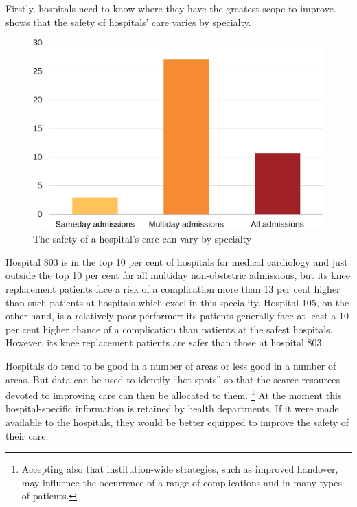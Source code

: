 \documentclass[FrontPage]{grattan}
\begin{document}
Firstly, hospitals need to know where they have the greatest scope to improve.
 shows that the safety of hospitals' care varies by specialty.

\begin{figure}
\caption{The safety of a hospital's care can vary by specialty}\label{fig:safety-of-hospitals-care-varies-by-specialty}
\includegraphics[page=12]{atlas/comps_charts.pdf}
\end{figure}

Hospital 803 is in the top 10 per cent of hospitals for medical cardiology and just outside the top 10 per cent for all multiday non-obstetric admissions, but its knee replacement patients face a risk of a complication more than 13 per cent higher than such patients at hospitals which excel in this speciality.
Hospital 105, on the other hand, is a relatively poor performer: its patients generally face at least a 10 per cent higher chance of a complication than patients at the safest hospitals.
However, its knee replacement patients are safer than those at hospital 803.

Hospitals do tend to be good in a number of areas or less good in a number of areas.
But data can be used to identify ``hot spots'' so that the scarce resources devoted to improving care can then be allocated to them.%
	\footnote{Accepting also that institution-wide strategies, such as improved handover, may influence the occurrence of a range of complications and in many types of patients.}
At the moment this hospital-specific information is retained by health departments.
If it were made available to the hospitals, they would be better equipped to improve the safety of their care.
\end{document}

